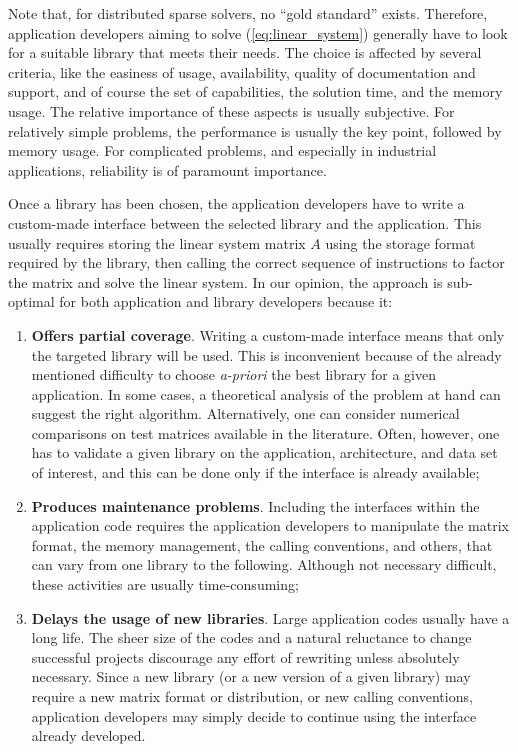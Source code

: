 \documentclass{llncs}
\begin{document}
\smallskip

Note that,
for distributed sparse solvers, no
``gold standard'' exists. Therefore, application developers aiming to solve
(\ref{eq:linear_system}) generally have to look for a suitable
library that meets their needs. The choice is affected by several criteria,
like the easiness of
usage, availability, quality of documentation and support, and of course
the set of capabilities, the solution time, and the memory usage.
The relative importance of these aspects is usually subjective. For
relatively simple problems, the performance is usually the key point, followed
by memory usage. For complicated problems, and especially in industrial
applications, reliability is of paramount importance.

Once a library has been chosen, the application developers have to write a
custom-made interface between the selected library and the application. This
usually requires storing the linear system matrix $A$ using the storage format
required by the library, then calling the correct sequence of instructions to
factor the matrix and solve the linear system.  In our opinion, the approach
is sub-optimal for both application and library developers because it:
\begin{enumerate}

\item
{\bf Offers partial coverage}. Writing a custom-made interface means
that only the targeted library will be used. This is inconvenient
because of the already mentioned difficulty to choose {\it a-priori}
the best library for a given application. In some cases, a
theoretical analysis of the problem at hand can suggest the right
algorithm. Alternatively, one can consider numerical comparisons on
test matrices available in the literature.
Often, however, one has to validate a given library on the
application, architecture, and data set of interest, and this can be
done only if the interface is already available;

\item
{\bf Produces maintenance problems}. Including the interfaces within
the application code requires the application developers to
manipulate the matrix format, the memory management, the calling
conventions, and others, that can vary from one library to the
following. Although not necessary difficult, these activities are
usually time-consuming;

\item
{\bf Delays the usage of new libraries}. Large application codes
usually have a long life.  The sheer size of the codes and a natural
reluctance to change successful projects discourage any effort of
rewriting unless absolutely necessary. Since a new library (or a new
version of a given library) may require a new matrix format or
distribution, or new calling conventions, application developers may
simply decide to continue using the interface already developed.
\end{enumerate}
\end{document}
